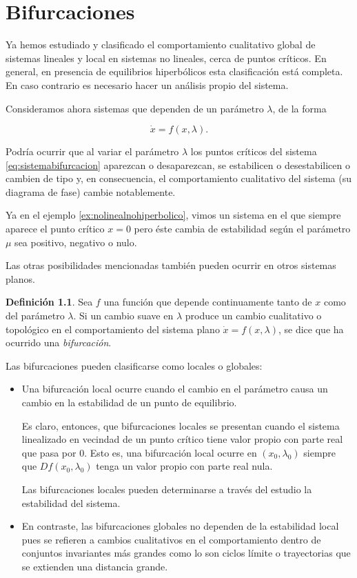 \documentclass[11pt]{book}
\theoremstyle{definition}
\newtheorem{definition}{Definición}
\numberwithin{definition}{section}
\theoremstyle{theorem}
\numberwithin{theorem}{section}
\numberwithin{lemma}{section}
\numberwithin{corollary}{section}
\theoremstyle{plain}
\numberwithin{example}{section}
\begin{document}
\chapter{Bifurcaciones}
Ya hemos estudiado y clasificado el comportamiento cualitativo global de sistemas lineales y local en sistemas no lineales, cerca de puntos críticos. En general, en presencia de equilibrios hiperbólicos esta clasificación está completa. En caso contrario es necesario hacer un análisis propio del sistema.

Consideramos ahora sistemas que dependen de un parámetro $\lambda$, de la forma

\begin{equation} \label{eq:sistemabifurcacion}
	\dot{x} = f(x, \lambda).
\end{equation}

Podría ocurrir que al variar el parámetro $\lambda$ los puntos críticos del sistema \ref{eq:sistemabifurcacion} aparezcan o desaparezcan, se estabilicen o desestabilicen o cambien de tipo y, en consecuencia, el comportamiento cualitativo del sistema (su diagrama de fase) cambie notablemente.

Ya en el ejemplo \ref{ex:nolinealnohiperbolico}, vimos un sistema en el que siempre aparece el punto crítico $x = 0$ pero éste cambia de estabilidad según el parámetro $\mu$ sea positivo, negativo o nulo.

Las otras posibilidades mencionadas también pueden ocurrir en otros sistemas planos.

\begin{definition} \label{def:bifurcacion}
Sea $f$ una función que depende continuamente tanto de $x$ como del parámetro $\lambda$. Si un cambio suave en $\lambda$ produce un cambio cualitativo o topológico en el comportamiento del sistema plano $\dot{x} = f(x,\lambda)$, se dice que ha ocurrido una \emph{bifurcación}.
\end{definition}

Las bifurcaciones pueden clasificarse como locales o globales:
\begin{itemize}
	\item Una bifurcación local ocurre cuando el cambio en el parámetro causa un cambio en la estabilidad de un punto de equilibrio.

	Es claro, entonces, que bifurcaciones locales se presentan cuando el sistema linealizado en vecindad de un punto crítico tiene valor propio con parte real que pasa por $0$.
	Esto es, una bifurcación local ocurre en $(x_0, \lambda_0)$ siempre que $Df(x_0, \lambda_0)$ tenga un valor propio con parte real nula.

	Las bifurcaciones locales pueden determinarse a través del estudio la estabilidad del sistema.

	\item En contraste, las bifurcaciones globales no dependen de la estabilidad local pues se refieren a cambios cualitativos en el comportamiento dentro de conjuntos invariantes más grandes como lo son ciclos límite o trayectorias que se extienden una distancia grande.
\end{itemize}
\end{document}
